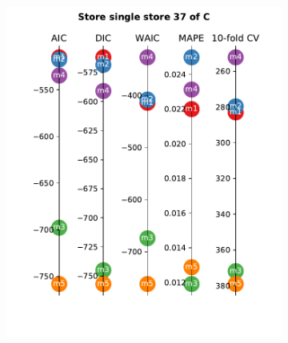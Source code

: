 \documentclass[english, 12pt, a4paper, sci, utf8, a-1b, online]{aaltothesis}
\begin{document}
\begin{figure}
\begin{subfigure}[htb]{0.33\textwidth}
	\end{subfigure}

	\begin{subfigure}[htb]{0.33\textwidth}
		\centering
		\includegraphics[width=\textwidth]{../plots/metrics/metrics_plot_single_store_37_of_C.pdf}
	\end{subfigure}
	\hfill
	\begin{subfigure}[htb]{0.33\textwidth}
		\centering

\end{subfigure}
\end{figure}
\end{document}
